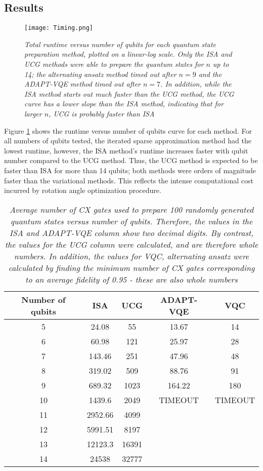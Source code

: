 \documentclass{article}
\begin{document}
\subsection{Results}
\begin{figure}[H]
\centering
\texttt{[image: Timing.png]}
\caption{\textit{Total runtime versus number of qubits for each quantum state
preparation method, plotted on a linear-log scale. Only the ISA and UCG methods
were able to prepare the quantum states for $n$ up to 14; the alternating
ansatz method timed out after $n = 9$ and the ADAPT-VQE method timed out after
$n = 7$. In addition, while the ISA method starts out much faster than the UCG
method, the UCG curve has a lower slope than the ISA method, indicating that for
larger $n$, UCG is probably faster than ISA}}
\label{fig:timing_figure}
\end{figure}

Figure \ref{fig:timing_figure} shows the runtime versus number of qubits curve for each method. For 
all numbers of qubits tested, the iterated sparse approximation method had the 
lowest runtime, however, the ISA method's runtime increases faster with
qubit number compared to the UCG method. Thus, the UCG method is expected to
be faster than ISA for more than 14 qubits; both methods were orders of
magnitude faster than the variational methods. This reflects the intense
computational cost incurred by rotation angle optimization procedure.

\begin{table}
\begin{tabular}{c | c | c | c | c}
  \textbf{Number of qubits} & \textbf{ISA} & \textbf{UCG} & \textbf{ADAPT-VQE} & \textbf{VQC} \\
  \hline
  5 & 24.08 & 55 & 13.67 & 14 \\
  6 & 60.98 & 121 & 25.97 & 28 \\
  7 & 143.46 & 251 & 47.96 & 48 \\
  8 & 319.02 & 509 & 88.76 & 91 \\
  9 & 689.32 & 1023 & 164.22 & 180 \\
  10 & 1439.6 & 2049 & TIMEOUT & TIMEOUT \\
  11 & 2952.66 & 4099 & & \\
  12 & 5991.51 & 8197 & & \\
  13 & 12123.3 & 16391 & & \\
  14 & 24538 & 32777 & & \\
\end{tabular}
\caption{\textit{Average number of CX gates used to prepare 100
randomly generated quantum states versus number of qubits. Therefore, the values
in the ISA and ADAPT-VQE column show two decimal digits. By contrast, the values
for the UCG column were calculated, and are therefore whole numbers. In
addition, the values for VQC, alternating ansatz were calculated by finding
the minimum number of CX gates corresponding to an average fidelity of 0.95 - 
these are also whole numbers}}
\end{table}
\end{document}

